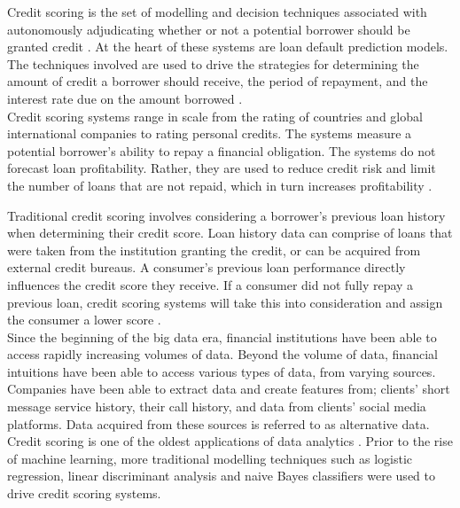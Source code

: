 Credit scoring is the set of modelling and decision techniques associated with autonomously adjudicating whether or not a potential borrower should be granted credit \parencite{PerceptronScoring}. At the heart of these systems are loan default prediction models. The techniques involved are used to drive the strategies for determining the amount of credit a borrower should receive, the period of repayment, and the interest rate due on the amount borrowed \parencite{CreditRiskSummary}. \\

Credit scoring systems range in scale from the rating of countries and global international companies to rating personal credits. The systems measure a potential borrower's ability to repay a financial obligation. The systems do not forecast loan profitability. Rather, they are used to reduce credit risk and limit the number of loans that are not repaid, which in turn increases profitability \parencite{EarlyNNScoring}. \newpage

Traditional credit scoring involves considering a borrower's previous loan history when determining their credit score. Loan history data can comprise of loans that were taken from the institution granting the credit, or can be acquired from external credit bureaus. A consumer's previous loan performance directly influences the credit score they receive. If a consumer did not fully repay a previous loan, credit scoring systems will take this into consideration and assign the consumer a lower score \parencite{DynamicBehaviouralScoring}. \\

Since the beginning of the big data era, financial institutions have been able to access rapidly increasing volumes of data. Beyond the volume of data, financial intuitions have been able to access various types of data, from varying sources. Companies have been able to extract data and create features from; clients' short message service history, their call history, and data from clients' social media platforms. Data acquired from these sources is referred to as alternative data.\\

Credit scoring is one of the oldest applications of data analytics \parencite{IntroToCreditModelling}. Prior to the rise of machine learning, more traditional modelling techniques such as logistic regression, linear discriminant analysis and naive Bayes classifiers were used to drive credit scoring systems. \\

